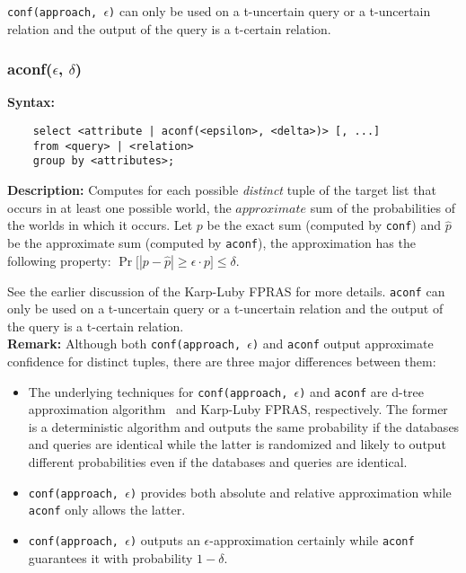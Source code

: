  {\tt conf(approach, $\epsilon$)} can only be used on a t-uncertain query or a t-uncertain relation and the output of the query is a t-certain relation.

\subsubsection{aconf($\epsilon$, $\delta$)}

\noindent \textbf{Syntax:}
\begin{verbatim}
	select <attribute | aconf(<epsilon>, <delta>)> [, ...]
	from <query> | <relation>	
	group by <attributes>; 
\end{verbatim}

\noindent \textbf{Description:}
Computes for each possible {\em distinct}\/ tuple of the target list that occurs in at least one possible world, the $approximate$ sum of the probabilities of the worlds in which it occurs. Let $p$ be the exact sum (computed by {\tt conf}) and $\hat{p}$ be the approximate sum (computed by {\tt aconf}), the approximation has the following property: $\Pr\big[ |p - \hat{p}| \ge \epsilon \cdot p \big] \le \delta$.

See the earlier discussion of the Karp-Luby FPRAS for more details. {\tt aconf} can only be used on a t-uncertain query or a t-uncertain relation and the output of the query is a t-certain relation. \\

\noindent \textbf{Remark:}
Although both {\tt conf(approach, $\epsilon$)} and {\tt aconf} output approximate confidence for distinct tuples, there are three major differences between them:
\begin{itemize}
\item The underlying techniques for {\tt conf(approach, $\epsilon$)} and 
{\tt aconf} are d-tree approximation algorithm~\cite{OHK2010} and Karp-Luby FPRAS, respectively. 
The former is a deterministic algorithm and outputs the same probability if the 
databases and queries are identical while the latter is randomized and likely to output
different probabilities even if the databases and queries are identical. 
\item {\tt conf(approach, $\epsilon$)} provides both absolute and relative approximation while {\tt aconf} only allows the latter.
\item {\tt conf(approach, $\epsilon$)} outputs an $\epsilon$-approximation certainly while {\tt aconf} guarantees it with probability $1-\delta$. 
\end{itemize}

